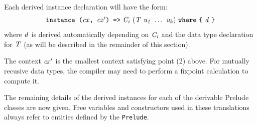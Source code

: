 
Each derived instance declaration will have the form:
\[
\mbox{$\it \makebox{\tt instance\ (}cx\makebox{\tt ,\ }cx'\makebox{\tt )\ =>}\ C_i\ (T\ u_1\ \ldots \ u_k)\ \makebox{\tt where}\ \makebox{\tt {\char'173}}\ d\ \makebox{\tt {\char'175}}$}
\]
where \mbox{$\it d$} is derived automatically depending on \mbox{$\it C_i$} and the data
type declaration for \mbox{$\it T$} (as will be described in the remainder of
this section).

The context \mbox{$\it cx'$} is the smallest context satisfying point (2) above.
For mutually recusive data types, the compiler may need to perform a
fixpoint calculation to compute it.

The remaining details of the derived
instances for each of the derivable Prelude classes are now given.
Free variables and constructors used in these translations
always refer to entities defined by the \mbox{\tt Prelude}.

